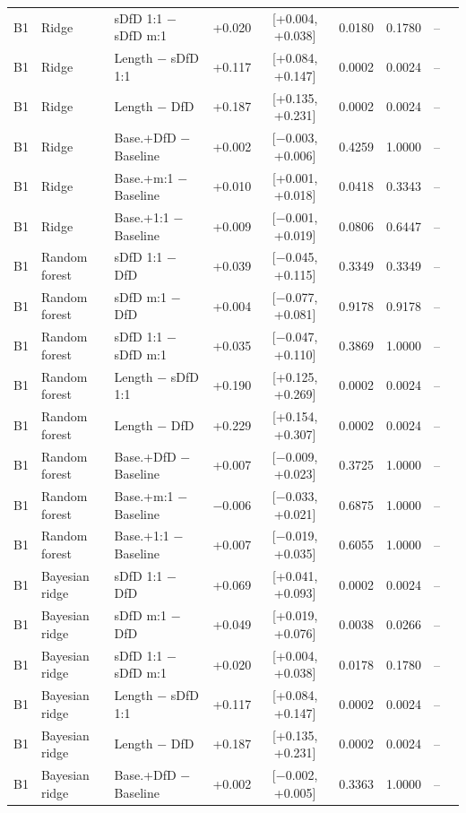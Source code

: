 \begin{longtable}{lllcccccc}
B1 & Ridge & sDfD 1:1 $-$ sDfD m:1 & +0.020 & [+0.004, +0.038] & 0.0180 & 0.1780 & -- \\
B1 & Ridge & Length $-$ sDfD 1:1 & +0.117 & [+0.084, +0.147] & 0.0002 & 0.0024 & -- \\
B1 & Ridge & Length $-$ DfD & +0.187 & [+0.135, +0.231] & 0.0002 & 0.0024 & -- \\
B1 & Ridge & Base.+DfD $-$ Baseline & +0.002 & [$-$0.003, +0.006] & 0.4259 & 1.0000 & -- \\
B1 & Ridge & Base.+m:1 $-$ Baseline & +0.010 & [+0.001, +0.018] & 0.0418 & 0.3343 & -- \\
B1 & Ridge & Base.+1:1 $-$ Baseline & +0.009 & [$-$0.001, +0.019] & 0.0806 & 0.6447 & -- \\
B1 & Random forest & sDfD 1:1 $-$ DfD & +0.039 & [$-$0.045, +0.115] & 0.3349 & 0.3349 & -- \\
B1 & Random forest & sDfD m:1 $-$ DfD & +0.004 & [$-$0.077, +0.081] & 0.9178 & 0.9178 & -- \\
B1 & Random forest & sDfD 1:1 $-$ sDfD m:1 & +0.035 & [$-$0.047, +0.110] & 0.3869 & 1.0000 & -- \\
B1 & Random forest & Length $-$ sDfD 1:1 & +0.190 & [+0.125, +0.269] & 0.0002 & 0.0024 & -- \\
B1 & Random forest & Length $-$ DfD & +0.229 & [+0.154, +0.307] & 0.0002 & 0.0024 & -- \\
B1 & Random forest & Base.+DfD $-$ Baseline & +0.007 & [$-$0.009, +0.023] & 0.3725 & 1.0000 & -- \\
B1 & Random forest & Base.+m:1 $-$ Baseline & $-$0.006 & [$-$0.033, +0.021] & 0.6875 & 1.0000 & -- \\
B1 & Random forest & Base.+1:1 $-$ Baseline & +0.007 & [$-$0.019, +0.035] & 0.6055 & 1.0000 & -- \\
B1 & Bayesian ridge & sDfD 1:1 $-$ DfD & +0.069 & [+0.041, +0.093] & 0.0002 & 0.0024 & -- \\
B1 & Bayesian ridge & sDfD m:1 $-$ DfD & +0.049 & [+0.019, +0.076] & 0.0038 & 0.0266 & -- \\
B1 & Bayesian ridge & sDfD 1:1 $-$ sDfD m:1 & +0.020 & [+0.004, +0.038] & 0.0178 & 0.1780 & -- \\
B1 & Bayesian ridge & Length $-$ sDfD 1:1 & +0.117 & [+0.084, +0.147] & 0.0002 & 0.0024 & -- \\
B1 & Bayesian ridge & Length $-$ DfD & +0.187 & [+0.135, +0.231] & 0.0002 & 0.0024 & -- \\
B1 & Bayesian ridge & Base.+DfD $-$ Baseline & +0.002 & [$-$0.002, +0.005] & 0.3363 & 1.0000 & -- \\

\end{longtable}
